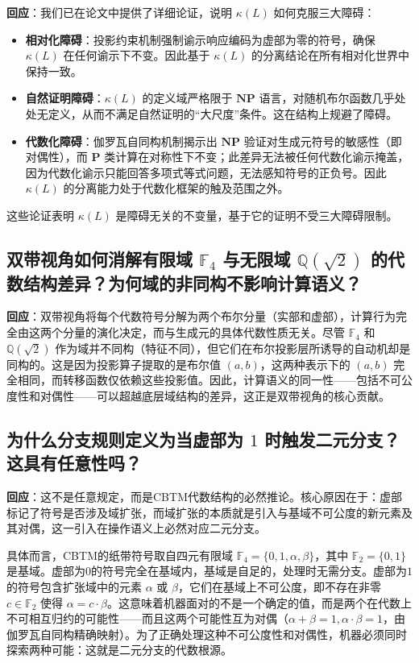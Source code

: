 \documentclass{ctexart}
\begin{document}
	\textbf{回应}：我们已在论文\cite{measure2026}中提供了详细论证，说明 $\kappa(L)$ 如何克服三大障碍：
	\begin{itemize}
		\item \textbf{相对化障碍}：投影约束机制强制谕示响应编码为虚部为零的符号，确保 $\kappa(L)$ 在任何谕示下不变。因此基于 $\kappa(L)$ 的分离结论在所有相对化世界中保持一致。
		\item \textbf{自然证明障碍}：$\kappa(L)$ 的定义域严格限于 $\mathbf{NP}$ 语言，对随机布尔函数几乎处处无定义，从而不满足自然证明的``大尺度''条件。这在结构上规避了障碍。
		\item \textbf{代数化障碍}：伽罗瓦自同构机制揭示出 $\mathbf{NP}$ 验证对生成元符号的敏感性（即对偶性），而 $\mathbf{P}$ 类计算在对称性下不变；此差异无法被任何代数化谕示掩盖，因为代数化谕示只能回答多项式等式问题，无法感知符号的正负号。因此 $\kappa(L)$ 的分离能力处于代数化框架的触及范围之外。
	\end{itemize}
	这些论证表明 $\kappa(L)$ 是障碍无关的不变量，基于它的证明不受三大障碍限制。
	
	
	\subsection{双带视角如何消解有限域 $\mathbb{F}_4$ 与无限域 $\mathbb{Q}(\sqrt{2})$ 的代数结构差异？为何域的非同构不影响计算语义？}
	
	\textbf{回应}：双带视角将每个代数符号分解为两个布尔分量（实部和虚部），计算行为完全由这两个分量的演化决定，而与生成元的具体代数性质无关。尽管 $\mathbb{F}_4$ 和 $\mathbb{Q}(\sqrt{2})$ 作为域并不同构（特征不同），但它们在布尔投影层所诱导的自动机却是同构的。这是因为投影算子提取的是布尔值 $(a, b)$，这两种表示下的 $(a, b)$ 完全相同，而转移函数仅依赖这些投影值。因此，计算语义的同一性——包括不可公度性和对偶性——可以超越底层域结构的差异，这正是双带视角的核心贡献。
	
	
	\subsection{为什么分支规则定义为当虚部为 $1$ 时触发二元分支？这具有任意性吗？}
	
	\textbf{回应}：这不是任意规定，而是CBTM代数结构的必然推论。核心原因在于：虚部标记了符号是否涉及域扩张，而域扩张的本质就是引入与基域不可公度的新元素及其对偶，这一引入在操作语义上必然对应二元分支。
	
	具体而言，CBTM的纸带符号取自四元有限域 $\mathbb{F}_4 = \{0, 1, \alpha, \beta\}$，其中 $\mathbb{F}_2 = \{0, 1\}$ 是基域。虚部为$0$的符号完全在基域内，基域是自足的，处理时无需分支。虚部为$1$的符号包含扩张域中的元素 $\alpha$ 或 $\beta$，它们在基域上不可公度，即不存在非零 $c \in \mathbb{F}_2$ 使得 $\alpha = c \cdot \beta$。这意味着机器面对的不是一个确定的值，而是两个在代数上不可相互归约的可能性——而且这两个可能性互为对偶（$\alpha + \beta = 1, \alpha \cdot \beta = 1$，由伽罗瓦自同构精确映射）。为了正确处理这种不可公度性和对偶性，机器必须同时探索两种可能：这就是二元分支的代数根源。
	
\end{document}
